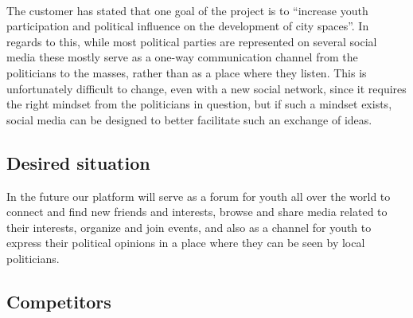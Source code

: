 \paragraph{} The customer has stated that one goal of the project is to “increase youth participation and political influence on the development of city spaces”. In regards to this, while most political parties are represented on several social media these mostly serve as a one-way communication channel from the politicians to the masses, rather than as a place where they listen. This is unfortunately difficult to change, even with a new social network, since it requires the right mindset from the politicians in question, but if such a mindset exists, social media can be designed to better facilitate such an exchange of ideas.

\subsection{Desired situation}
\label{subsec:PrelimMarketDesired}

In the future our platform will serve as a forum for youth all over the world to connect and find new friends and interests, browse and share media related to their interests, organize and join events, and also as a channel for youth to express their political opinions in a place where they can be seen by local politicians.

\subsection{Competitors}
\label{subsec:PrelimMarketCompetitors}

